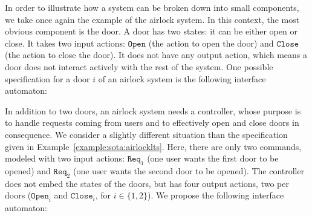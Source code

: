 \begin{example}
  \label{example:sota:airlockinterface}

  In order to illustrate how a system can be broken down into small components,
  we take once again the example of the airlock system.
  In this context, the most obvious component is the door.
  A door has two states: it can be either open or close.
  It takes two input actions: \( \mathtt{Open} \) (the action to open the door)
  and \( \mathtt{Close} \) (the action to close the door).
  It does not have any output action, which means a door does not interact
  actively with the rest of the system.
  One possible specification for a door $i$ of an airlock system is
  the following interface automaton:

  \begin{center}
  \end{center}

  In addition to two doors, an airlock system needs a controller, whose purpose
  is to handle requests coming from users and to effectively open and close doors
  in consequence.
  We consider a slightly different situation than the specification given in
  Example~\ref{example:sota:airlocklts}.
  Here, there are only two commands, modeled with two input actions:
  \( \mathtt{Req}_1 \) (one user wants the first door to be opened) and
  \( \mathtt{Req}_2 \) (one user wants the second door to be opened).
  The controller does not embed the states of the doors, but has four output
  actions, two per doors (\( \mathtt{Open}_i \) and \( \mathtt{Close}_i\), for
  \( i \in \{1, 2\}\)).
  We propose the following interface automaton:


\end{example}
